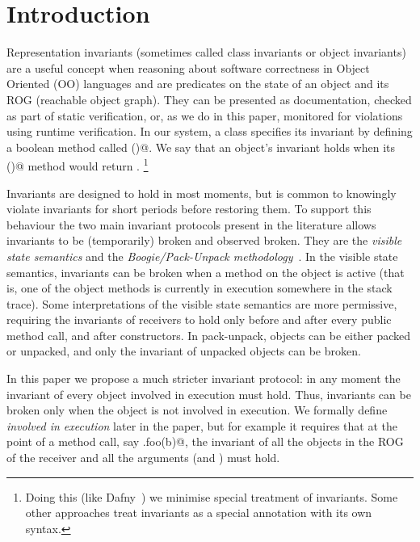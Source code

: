\section{Introduction}
\label{s:intro}
Representation invariants (sometimes called class invariants or object invariants) are
a useful concept when reasoning about software correctness in Object Oriented (OO) languages and are predicates on the state of an object and its ROG (reachable object graph).
They can be presented as documentation, checked as part of static verification, or, as we do in this paper, monitored for violations using runtime verification.
In our system, a class specifies its invariant by defining a boolean method called \Q@invariant()@.
We say that an object's invariant holds when its \Q@invariant()@ method would return \Q@true@. 
\footnote{Doing this (like Dafny~\cite{DBLP:conf/sigada/Leino12}) we minimise special treatment of invariants. Some other approaches treat invariants as a special annotation with its own syntax.}

Invariants are designed to hold in most moments, but 
is common to knowingly violate invariants for short periods before restoring them.
To support this behaviour the two main invariant protocols present in the literature allows invariants to be (temporarily) broken and observed broken.
They are the \emph{visible state semantics} \cite{Meyer:1988:OSC:534929} and the \emph{Boogie/Pack-Unpack methodology}~\cite{DBLP:journals/jot/BarnettDFLS04}.
In the visible state semantics, invariants can be broken when a method on the object is active (that is, one of the object methods is currently in execution somewhere in the stack trace).
Some interpretations of the visible state semantics are more permissive, requiring the invariants of receivers to hold only before and after every public method call, and after constructors. 
In pack-unpack, objects can be either packed or unpacked, and only the invariant of unpacked objects can be broken.

In this paper we propose a much stricter invariant protocol: in any moment the invariant of every object involved in execution must hold.
Thus, invariants can be broken only when the object is not involved in execution. We formally define \emph{involved in execution} later in the paper, but for example it requires that at the point of a method call, say \Q@a.foo(b)@, the invariant of all the objects in the ROG of the receiver and all the arguments (\Q@a@ and \Q@b@) must hold.

